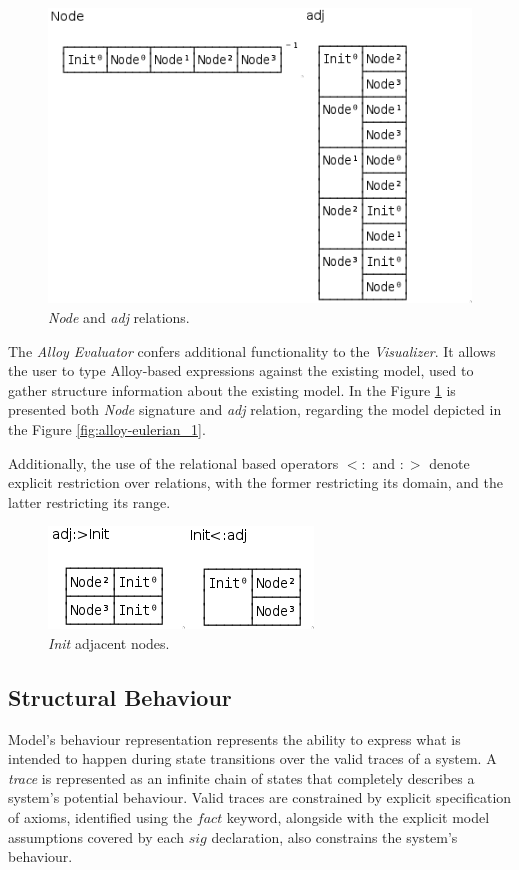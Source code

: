 \begin{figure}[H]
    \centering
    \includegraphics[width=0.4\linewidth]{images/alloy_evaluator1.png}
    \caption{\textit{Node} and \textit{adj} relations.}
    \label{fig:alloy-evaluator_1}
\end{figure}

The \textit{Alloy Evaluator} \cite{alloy-6} confers additional functionality to the \textit{Visualizer}. It allows the user to type Alloy-based expressions against the existing model, used to gather structure information about the existing model. \cite{alloy-docs} In the Figure \ref{fig:alloy-evaluator_1} is presented both \textit{Node} signature and \textit{adj} relation, regarding the model depicted in the Figure \ref{fig:alloy-eulerian_1}.

Additionally, the use of the relational based operators $<:$ and $:>$ denote explicit restriction over relations, with the former restricting its domain, and the latter restricting its range.

\begin{figure}[H]
    \centering
    \includegraphics[width=0.4\linewidth]{images/alloy_evaluator2.png}
    \caption{\textit{Init} adjacent nodes.}
    \label{fig:alloy-evaluator_2}
\end{figure}


\subsection{Structural Behaviour}

Model's behaviour representation represents the ability to express what is intended to happen during state transitions over the valid traces of a system. A \textit{trace} is represented as an infinite chain of states that completely describes a system's potential behaviour. Valid traces are constrained by explicit specification of axioms, identified using the $fact$ keyword, alongside with the explicit model assumptions covered by each $sig$ declaration, also constrains the system's behaviour. \cite{gheyi2007formally}

